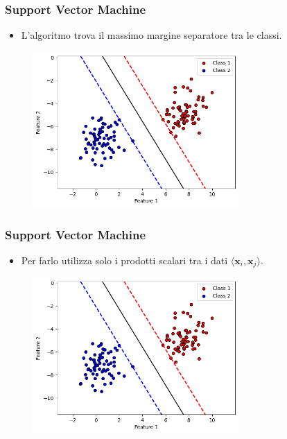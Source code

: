 \documentclass{beamer}
\begin{document}
  \begin{frame}
    \frametitle{Support Vector Machine}
      \begin{itemize}
        \item L'algoritmo trova il massimo margine separatore tra le classi. 
      \end{itemize}
        \begin{figure}
              \includegraphics[width=0.7\textwidth]{images/classicalsvm.png}
         \end{figure}
    \end{frame}


    \begin{frame}
      \frametitle{Support Vector Machine}
        \begin{itemize}
          \item Per farlo utilizza solo i prodotti scalari tra i dati $\langle \mathbf{x}_i, \mathbf{x}_j\rangle$.  
        \end{itemize}
          \begin{figure}
                \includegraphics[width=0.7\textwidth]{images/classicalsvm.png}
           \end{figure}
      \end{frame}
\end{document}
